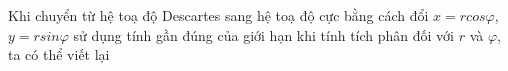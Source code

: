 \documentclass[preview]{standalone}
\begin{document}
\begin{center}
Khi chuyển từ hệ toạ độ Descartes sang hệ toạ độ cực bằng cách đổi \textbf{$x=rcos\varphi$}, \textbf{$y=rsin\varphi$} sử dụng tính gần đúng của giới hạn khi tính tích phân đối với \textbf{$r$} và \textbf{$\varphi$}, ta có thể viết lại
\end{center}
\end{document}
